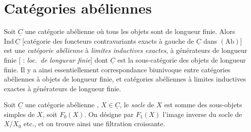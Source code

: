 \documentclass[11pt,a4paper]{article}
\begin{document}

\section*{Catégories abéliennes}


Soit $\underline{C}$ une catégorie abélienne où tous les objets sont de
longueur finie. Alors $\mathrm{Ind}\,\underline{C}$ [catégorie des
foncteurs contravariants exacts à gauche de $\underline{C}$ dans
\struck{\ill{}} $(\mathrm{Ab})$] est une \emph{catégorie abélienne} à
\emph{limites inductives exactes}, à générateurs de longueur finie
[  : \emph{loc.\ de longueur finie}]
dont $\underline{C}$ est la sous-catégorie des objets de longueur finie.
Il y a ainsi essentiellement correspondance biunivoque entre catégories
abéliennes à objets de longueur finie, et catégories abéliennes à limites
inductives exactes à générateurs de longueur finie.

Soit $\underline{C}$ une catégorie abélienne , $X \in \underline{C}$, le \emph{socle} de $X$ est
 somme des sous-objets simples de $X$, soit $F_0(X)$. On
désigne par $F_1(X)$ l'image inverse du socle de $X/X_0$ etc., et on
trouve ainsi une filtration croissante. \struck{\ill{}}

\end{document}

